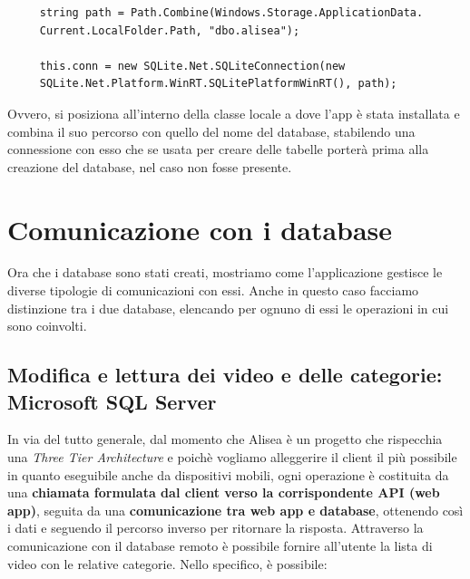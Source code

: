 \documentclass[a4]{book}
\begin{document}
\begin{lstlisting}
	 string path = Path.Combine(Windows.Storage.ApplicationData.
	 Current.LocalFolder.Path, "dbo.alisea");
	 
	 this.conn = new SQLite.Net.SQLiteConnection(new
	 SQLite.Net.Platform.WinRT.SQLitePlatformWinRT(), path);
\end{lstlisting}

Ovvero, si posiziona all'interno della classe locale a dove l'app è stata installata e combina il suo percorso con quello del nome del database, stabilendo una connessione con esso che se usata per creare delle tabelle porterà prima alla creazione del database, nel caso non fosse presente.



\section{Comunicazione con i database}
Ora che i database sono stati creati, mostriamo come l'applicazione gestisce le diverse tipologie di comunicazioni con essi. Anche in questo caso facciamo distinzione tra i due database, elencando per ognuno di essi le operazioni in cui sono coinvolti.

\subsection{Modifica e lettura dei video e delle categorie: Microsoft SQL Server}
In via del tutto generale, dal momento che Alisea è un progetto che rispecchia una \textit{Three Tier Architecture} e poichè vogliamo alleggerire il client il più possibile in quanto eseguibile anche da dispositivi mobili, ogni operazione è costituita da una \textbf{chiamata formulata dal client verso la corrispondente API (web app)}, seguita da una \textbf{comunicazione tra web app e database}, ottenendo così i dati e seguendo il percorso inverso per ritornare la risposta. Attraverso la comunicazione con il database remoto è possibile fornire all'utente la lista di video con le relative categorie. Nello specifico, è possibile:
\end{document}

